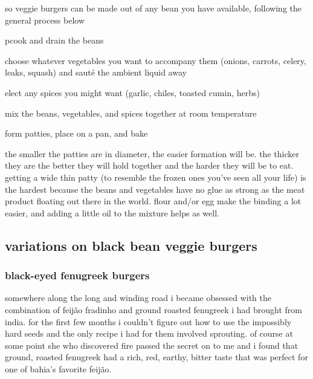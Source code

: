 so veggie burgers can be made out of any bean you have available, following 
the general process below

\begin{algorithm}
  \item pcook and drain the beans

  \item choose whatever vegetables you want to accompany them (onions, 
  carrots, celery, leaks, squash) and saut\'{e} the ambient liquid away

  \item elect any spices you might want (garlic, chiles, toasted cumin, herbs)

  \item mix the beans, vegetables, and spices together at room temperature

  \item form patties, place on a pan, and bake
\end{algorithm}

the smaller the patties are in diameter, the easier formation will be. the 
thicker they are the better they will hold together and the harder they will 
be to eat. getting a wide thin patty (to resemble the frozen ones you've seen 
all your life) is the hardest because the beans and vegetables have no glue as 
strong as the meat product floating out there in the world. flour and/or egg 
make the binding a lot easier, and adding a little oil to the mixture helps as 
well.

\subsection{variations on black bean veggie burgers}

\subsubsection{black-eyed fenugreek burgers}

somewhere along the long and winding road i became obsessed with the 
combination of feij\~{a}o fradinho and ground roasted fenugreek i had brought 
from india. for the first few months i couldn't figure out how to use the 
impossibly hard seeds and the only recipe i had for them involved sprouting. 
of course at some point she who discovered fire passed the secret on to me and 
i found that ground, roasted fenugreek had a rich, red, earthy, bitter taste 
that was perfect for one of bahia's favorite feij\~{a}o.

